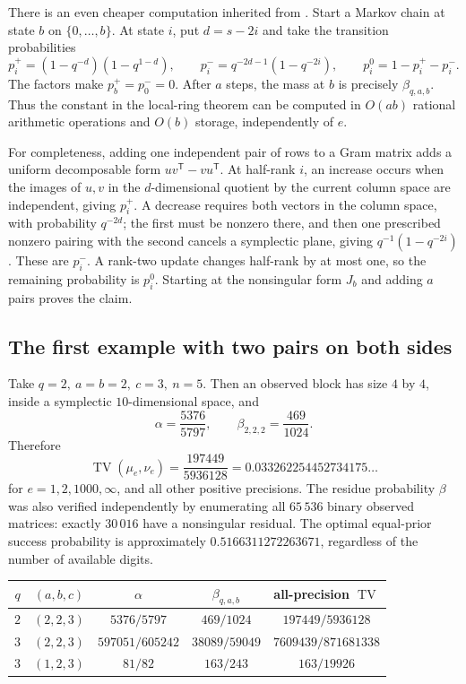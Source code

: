 \documentclass[11pt]{article}
\theoremstyle{remark}
\newcommand{\TV}{\operatorname{TV}}
\newcommand{\trans}{\mathsf T}
\begin{document}
There is an even cheaper computation inherited from \cite{FiniteTests}.
Start a Markov chain at state \(b\) on \(\{0,\ldots,b\}\).
At state \(i\), put \(d=s-2i\) and take the transition probabilities
\[
 p_i^+=(1-q^{-d})(1-q^{1-d}),\qquad
 p_i^-=q^{-2d-1}(1-q^{-2i}),\qquad
 p_i^0=1-p_i^+-p_i^- .
 \tag{6.3}\label{eq:chain}
\]
The factors make \(p_b^+=p_0^-=0\).
After \(a\) steps, the mass at \(b\) is precisely
\(\beta_{q,a,b}\). Thus the constant in the local-ring theorem can be
computed in \(O(ab)\) rational arithmetic operations and \(O(b)\) storage,
independently of \(e\).

For completeness, adding one independent pair of rows to a Gram matrix
adds a uniform decomposable form \(uv^\trans-vu^\trans\).
At half-rank \(i\), an increase occurs when the images of \(u,v\) in the
\(d\)-dimensional quotient by the current column space are independent,
giving \(p_i^+\). A decrease requires both vectors in the column space,
with probability \(q^{-2d}\); the first must be nonzero there, and then
one prescribed nonzero pairing with the second cancels a symplectic
plane, giving \(q^{-1}(1-q^{-2i})\).
These are \(p_i^-\). A rank-two update changes half-rank by at most one,
so the remaining probability is \(p_i^0\). Starting at the nonsingular
form \(J_b\) and adding \(a\) pairs proves the claim.

\subsection{The first example with two pairs on both sides}

Take \(q=2,\ a=b=2,\ c=3,\ n=5\). Then an observed block has size
\(4\) by \(4\), inside a symplectic \(10\)-dimensional space, and
\[
 \alpha=\frac{5376}{5797},\qquad
 \beta_{2,2,2}=\frac{469}{1024}.
\]
Therefore
\[
 \TV(\mu_e,\nu_e)
 =\frac{197449}{5936128}
 =0.033262254452734175\ldots
 \tag{6.4}\label{eq:example}
\]
for \(e=1,2,1000,\infty\), and all other positive precisions.
The residue probability \(\beta\) was also verified independently by
enumerating all \(65\,536\) binary observed matrices: exactly
\(30\,016\) have a nonsingular residual.
The optimal equal-prior success probability is approximately
\(0.5166311272263671\), regardless of the number of available digits.

\begin{center}
\small
\begin{tabular}{ccccc}
\toprule
\(q\)&\((a,b,c)\)&\(\alpha\)&\(\beta_{q,a,b}\)&all-precision \(\TV\)\\
\midrule
\(2\)&\((2,2,3)\)&\(5376/5797\)&\(469/1024\)&\(197449/5936128\)\\
\(3\)&\((2,2,3)\)&\(597051/605242\)&\(38089/59049\)&\(7609439/871681338\)\\
\(3\)&\((1,2,3)\)&\(81/82\)&\(163/243\)&\(163/19926\)\\
\bottomrule
\end{tabular}
\end{center}
\end{document}
